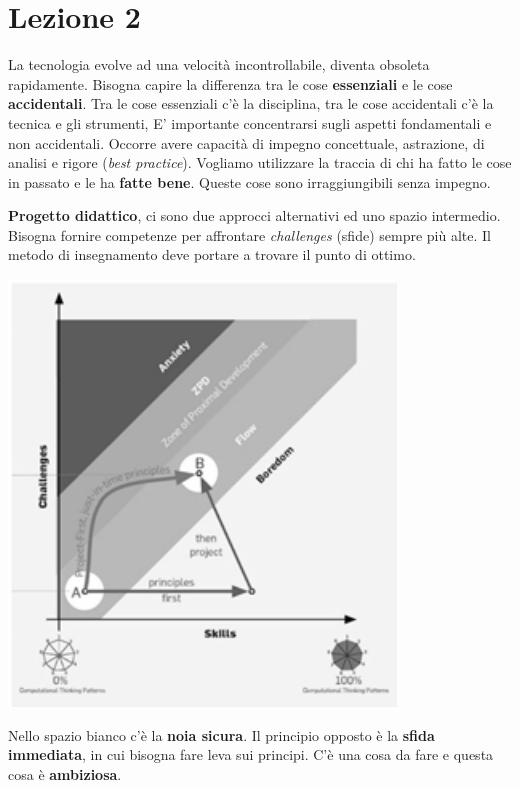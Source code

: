 


\section{Lezione 2}

La tecnologia evolve ad una velocità incontrollabile, diventa obsoleta rapidamente. Bisogna capire la differenza tra le cose \textbf{essenziali} e le cose \textbf{accidentali}. Tra le cose essenziali c'è la disciplina, tra le cose accidentali c'è la tecnica e gli strumenti, E' importante concentrarsi sugli aspetti fondamentali e non accidentali. Occorre avere capacità di impegno concettuale, astrazione, di analisi e rigore (\textit{best practice}). Vogliamo utilizzare la traccia di chi ha fatto le cose in passato e le ha \textbf{fatte bene}. Queste cose sono irraggiungibili senza impegno.

\textbf{Progetto didattico}, ci sono due approcci alternativi ed uno spazio intermedio. Bisogna fornire competenze per affrontare \textit{challenges} (sfide) sempre più alte. Il metodo di insegnamento deve portare a trovare il punto di ottimo.

\begin{center}

\includegraphics[width=0.75\columnwidth]{img1} %

\end{center}

Nello spazio bianco c'è la \textbf{noia sicura}. Il principio opposto è la \textbf{sfida immediata}, in cui bisogna fare leva sui principi. C'è una cosa da fare e questa cosa è \textbf{ambiziosa}.

